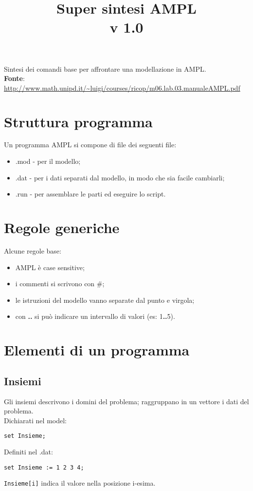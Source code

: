 

\title{Super sintesi AMPL \\ v 1.0}
\date{}



\maketitle
Sintesi dei comandi base per affrontare una modellazione in AMPL.\\
\textbf{Fonte}: \\
\url{http://www.math.unipd.it/~luigi/courses/ricop/m06.lab.03.manualeAMPL.pdf}

\section{Struttura programma}
Un programma AMPL si compone di file dei seguenti file:
\begin{itemize}
\item .mod - per il modello;
\item .dat - per i dati separati dal modello, in modo che sia facile cambiarli;
\item .run - per assemblare le parti ed eseguire lo script.
\end{itemize}

\section{Regole generiche}
Alcune regole base:
\begin{itemize}
\item AMPL è case sensitive;
\item i commenti si scrivono con \#;
\item le istruzioni del modello vanno separate dal punto e virgola;
\item con \textbf{..} si può indicare un intervallo di valori (es: 1\textbf{..}5).
\end{itemize}

\section{Elementi di un programma}

\subsection{Insiemi}

Gli insiemi descrivono i domini del problema; raggruppano in un vettore i dati del problema. \\
Dichiarati nel model:
\begin{verbatim}
set Insieme;
\end{verbatim}
Definiti nel .dat:
\begin{verbatim}
set Insieme := 1 2 3 4;
\end{verbatim}
\texttt{Insieme[i]} indica il valore nella posizione i-esima. \\

